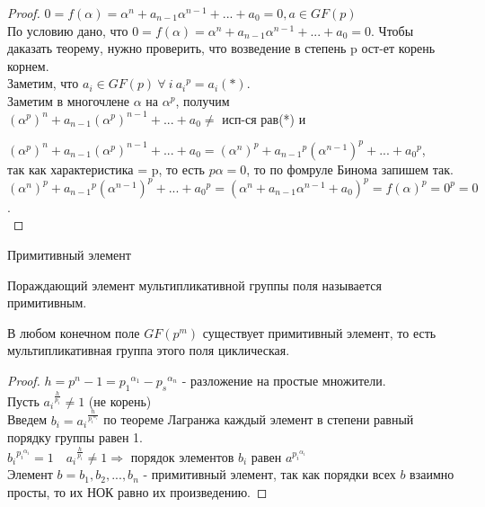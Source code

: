 \begin{proof}
  $0 = f(\alpha) = \alpha^n + a_{n-1}\alpha^{n-1} + ... + a_0 = 0, a \in GF(p)$\\
  По условию дано, что $0 = f(\alpha) = \alpha^n + a_{n-1}\alpha^{n-1} + ...
  + a_0 = 0$.
  Чтобы даказать теорему, нужно проверить, что возведение в степень p ост-ет
  корень корнем.\\
  Заметим, что $a_i \in GF(p) \ \forall\ i\ {a_i}^p = a_i(*)$.\\
  Заметим в многочлене $\alpha$ на $\alpha^p$, получим\\
  ${(\alpha^p)}^n + a_{n-1}{(\alpha^p)}^{n-1} + ... + a_0 \neq$ исп-ся рав(*) и

   ${(\alpha^p)}^n + a_{n-1}{(\alpha^p)}^{n-1} + ... + a_0 =
  {(\alpha^n)}^p + {a_{n-1}}^p{(\alpha^{n-1})}^p + ... + {a_0}^p$,\\
  так как характеристика = p, то есть $p\alpha = 0$, то по фомруле Бинома
  запишем так.\\
  ${(\alpha^n)}^p + {a_{n-1}}^p{(\alpha^{n-1})}^p + ... + {a_0}^p =
  {(\alpha^n + a_{n-1}\alpha^{n-1} + a_0)}^p = {f(\alpha)}^p = 0^p = 0$.\\
\end{proof}

\begin{title}
  Примитивный элемент
\end{title}

\begin{define}
  Пораждающий элемент мультипликативной группы поля называется примитивным.
\end{define}

\begin{theorem}
  В любом конечном поле $GF(p^m)$ существует примитивный элемент, то есть
мультипликативная группа этого поля циклическая.\\
\end{theorem}

\begin{proof}
  $h = p^n - 1 = {p_1}^{\alpha_1} - {p_s}^{\alpha_n}$ - разложение на простые
  множители.\\
  Пусть ${a_i}^{\frac{h}{p_i}} \neq 1$ (не корень)\\
  Введем $b_i = {a_i}^{\frac{n}{{p_i}^{\alpha_i}}}$ по теореме Лагранжа каждый
  элемент в степени
  равный порядку группы равен 1.\\
  ${b_i}^{{p_i}^{\alpha_i}} = 1\quad {a_i}^{\frac{h}{p_i}} \neq 1 \Rightarrow$
  порядок элементов
  $b_i$ равен  ${a}^{{p_i}^{\alpha_i}}$\\
  Элемент $b = b_1, b_2, ...,b_n$ - примитивный элемент, так как порядки всех
  $b$ взаимно просты, то их НОК равно их произведению.
\end{proof}

